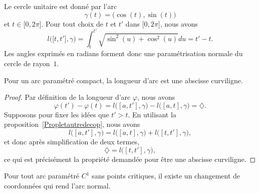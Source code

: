 \begin{example}     \label{ExCerlceRadNorm}
Le cercle unitaire est donné par l'arc
\begin{equation}
    \gamma(t)=\big( \cos(t),\sin(t) \big)
\end{equation}
et $t\in\mathopen[ 0 , 2\pi \mathclose]$. Pour tout choix de $t$ et $t'$ dans $\mathopen[ 0 , 2\pi \mathclose]$, nous avons
\begin{equation}
    l\big( \mathopen[ t , t' \mathclose],\gamma \big)=\int_t^{t'}\sqrt{\sin^2(u)+\cos^2(u)}du=t'-t.
\end{equation}
Les angles exprimés en radians forment donc une paramétrisation normale du cercle de rayon~$1$.
\end{example}

\begin{lemma}
Pour un arc paramétré compact, la longueur d'arc est une abscisse curviligne.
\end{lemma}

\begin{proof}
Par définition de la longueur d'arc $\varphi$, nous avons
\begin{equation}
    \varphi(t')-\varphi(t)=l\big( [a,t'],\gamma \big)-l\big( [a,t],\gamma \big)=\diamondsuit.
\end{equation}
Supposons pour fixer les idées que $t'>t$. En utilisant la proposition~\ref{Propletautredecop}, nous avons
\begin{equation}
    l\big( [a,t'],\gamma \big)=l\big( [a,t],\gamma \big)+l\big( [t,t'],\gamma \big),
\end{equation}
et donc après simplification de deux termes,
\begin{equation}
    \diamondsuit=l\big( [t,t'],\gamma \big),
\end{equation}
ce qui est précisément la propriété demandée pour être une abscisse curviligne.
\end{proof}

\begin{proposition}     \label{PropExisteChmNorm}
Pour tout arc paramétré $C^1$ sans points critiques, il existe un changement de coordonnées qui rend l'arc normal.
\end{proposition}

